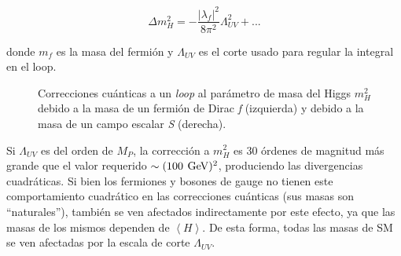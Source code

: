 \begin{equation}
\Delta m_{H}^{2}=-\frac{|\lambda_{f}|^{2}}{8\pi^{2}}\Lambda_{UV}^{2}+...
\label{fermion_corr}
\end{equation}

\noindent
donde $m_{f}$ es la masa del fermión y $\Lambda_{UV}$ es el corte usado para regular la integral en el loop. 

\begin{figure}
\centering

	\begin{subfigure}{0.45\textwidth}
	\end{subfigure}
	\hfill
	\begin{subfigure}{0.45\textwidth}
	\end{subfigure}

\caption{Correcciones cuánticas a un \textit{loop} al parámetro de masa del Higgs $m_{H}^{2}$ debido a la masa de un fermión de Dirac \textit{f} (izquierda) y debido a la masa de un campo escalar \textit{S} (derecha).}
\label{loops}
\end{figure}

Si $\Lambda_{UV}$ es del orden de $M_{P}$, la corrección a $m_{H}^{2}$ es 30 órdenes de magnitud más grande que el valor requerido $\sim (100\: \, \mathrm{GeV})^{2}$, produciendo las divergencias cuadráticas. Si bien los fermiones y bosones de gauge no tienen este comportamiento cuadrático en las correcciones cuánticas (sus masas son “naturales”), también se ven afectados indirectamente por este efecto, ya que las masas de los mismos dependen de $\left\langle H \right\rangle$. De esta forma, todas las masas de SM se ven afectadas por la escala de corte $\Lambda_{UV}$.

